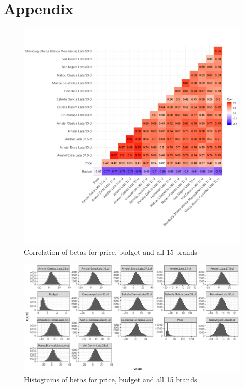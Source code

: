 \documentclass[12pt,a4paper]{article}
\begin{document}
\clearpage
\appendix
\section{Appendix}

\begin{figure}[ht]
	\centering
  \includegraphics[scale = 0.5]{figures/corrplot_betas_full.pdf}
	\caption{Correlation of betas for price, budget and all 15 brands}
	\label{fig_corr_all}
\end{figure}

\begin{figure}[ht]
	\centering
  \includegraphics[scale = 0.6]{figures/hist_betas_full.pdf}
	\caption{Histograms of betas for price, budget and all 15 brands}
	\label{fig_hist_all}
\end{figure}
\end{document}
